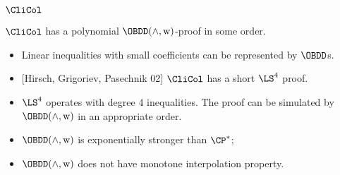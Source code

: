 \begin{frame}{$\CliCol$}

    \begin{theorem}
        $\CliCol$ has a polynomial $\OBDD(\land, \weakening)$-proof in some order.
    \end{theorem}

    \pause

    \begin{itemize}
        \item Linear inequalities with small coefficients can be represented by $\OBDD$s.
        \pause
        \item{} [Hirsch, Grigoriev, Pasechnik 02] $\CliCol$ has a short $\LS^4$ proof.
        \pause
        \item $\LS^4$ operates with degree $4$ inequalities. The proof can be simulated by $\OBDD(\land,
            \weakening)$ in an appropriate order.
    \end{itemize}

    \pause
    \begin{corollary}
        \begin{itemize}
            \item $\OBDD(\land, \weakening)$ is exponentially stronger than $\CP^*$;
            \item $\OBDD(\land, \weakening)$ does not have monotone interpolation property.
        \end{itemize}
    \end{corollary}

\end{frame}


